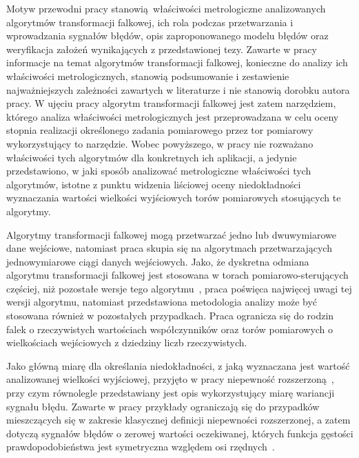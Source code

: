 Motyw przewodni pracy stanowią właściwości metrologiczne analizowanych algorytmów transformacji falkowej, ich rola podczas przetwarzania i wprowadzania sygnałów błędów, opis zaproponowanego modelu błędów oraz weryfikacja założeń wynikających z przedstawionej tezy. Zawarte w pracy informacje na temat algorytmów transformacji falkowej, konieczne do analizy ich właściwości metrologicznych, stanowią podsumowanie i zestawienie najważniejszych zależności zawartych w literaturze i nie stanowią dorobku autora pracy. W ujęciu pracy algorytm transformacji falkowej jest zatem narzędziem, którego analiza właściwości metrologicznych jest przeprowadzana w celu oceny stopnia realizacji określonego zadania pomiarowego przez tor pomiarowy wykorzystujący to narzędzie. Wobec powyższego, w pracy nie rozważano właściwości tych algorytmów dla konkretnych ich aplikacji, a jedynie przedstawiono, w jaki sposób analizować metrologiczne właściwości tych algorytmów, istotne z punktu widzenia liściowej oceny niedokładności wyznaczania wartości wielkości wyjściowych torów pomiarowych stosujących te algorytmy.

Algorytmy transformacji falkowej mogą przetwarzać jedno lub dwuwymiarowe dane wejściowe, natomiast praca skupia się na algorytmach przetwarzających jednowymiarowe ciągi danych wejściowych. Jako, że dyskretna odmiana algorytmu transformacji falkowej jest stosowana w torach pomiarowo-sterujących częściej, niż pozostałe wersje tego algorytmu~\cite{wallen_handbook, lord_guide, akujuobi_applications}, praca poświęca najwięcej uwagi tej wersji algorytmu, natomiast przedstawiona metodologia analizy może być stosowana również w pozostałych przypadkach. Praca ogranicza się do rodzin falek o rzeczywistych wartościach współczynników oraz torów pomiarowych o wielkościach wejściowych z dziedziny liczb rzeczywistych.

Jako główną miarę dla określania niedokładności, z jaką wyznaczana jest wartość analizowanej wielkości wyjściowej, przyjęto w pracy niepewność rozszerzoną~\cite{jcgm_guide}, przy czym równolegle przedstawiany jest opis wykorzystujący miarę wariancji sygnału błędu. Zawarte w pracy przykłady ograniczają się do przypadków mieszczących się w zakresie klasycznej definicji niepewności rozszerzonej, a zatem dotyczą sygnałów błędów o zerowej wartości oczekiwanej, których funkcja gęstości prawdopodobieństwa jest symetryczna względem osi rzędnych~\cite{jcgm_guide}.
